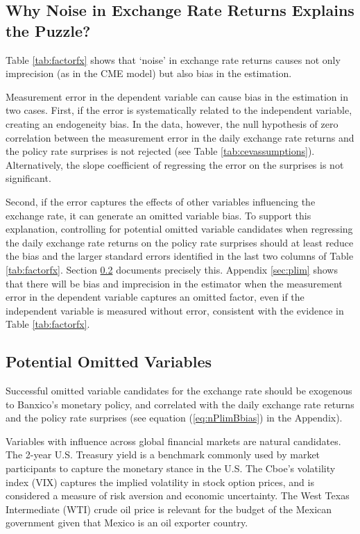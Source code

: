 \documentclass[a4paper,12pt]{article} 		%
\begin{document}
\sectitlespace
\subsection{Why Noise in Exchange Rate Returns Explains the Puzzle?}
\sectitlespace
Table \ref{tab:factorfx} shows that `noise’ in exchange rate returns causes not only imprecision (as in the CME model) but also bias in the estimation. 

Measurement error in the dependent variable can cause bias in the estimation in two cases. First, if the error is systematically related to the independent variable, creating an endogeneity bias. In the data, however, the null hypothesis of zero correlation between the measurement error in the daily exchange rate returns and the policy rate surprises is not rejected (see Table \ref{tab:cevassumptions}). Alternatively, the slope coefficient of regressing the error on the surprises is not significant. 

Second, if the error captures the effects of other variables influencing the exchange rate, it can generate an omitted variable bias. To support this explanation, controlling for potential omitted variable candidates when regressing the daily exchange rate returns on the policy rate surprises should at least reduce the bias and the larger standard errors identified in the last two columns of Table \ref{tab:factorfx}. Section \ref{sec:omittedvar} documents precisely this. 
Appendix \ref{sec:plim} shows that there will be bias and imprecision in the estimator when the measurement error in the dependent variable captures an omitted factor, even if the independent variable is measured without error, consistent with the evidence in Table \ref{tab:factorfx}.

\sectitlespace
\subsection{Potential Omitted Variables} \label{sec:omittedvar}
\sectitlespace
Successful omitted variable candidates for the exchange rate should be exogenous to Banxico's monetary policy, and correlated with the daily exchange rate returns and the policy rate surprises (see equation (\ref{eq:nPlimBbias}) in the Appendix). 

Variables with influence across global financial markets are natural candidates. The 2-year U.S. Treasury yield is a benchmark commonly used by market participants to capture the monetary stance in the U.S. 
The Cboe's volatility index (VIX) captures the implied volatility in stock option prices, and is considered a measure of risk aversion and economic uncertainty. The West Texas Intermediate (WTI) crude oil price is relevant for the budget of the Mexican government given that Mexico is an oil exporter country.
\end{document}
